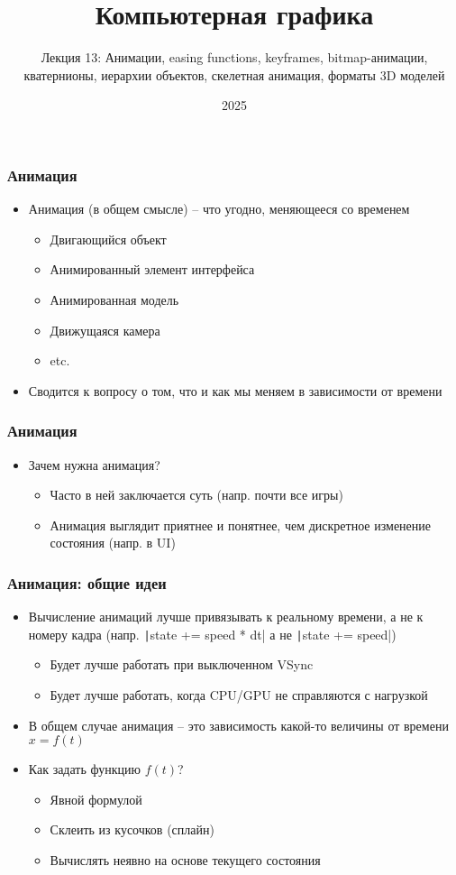 \documentclass[10pt]{beamer}
\title{Компьютерная графика}
\subtitle{Лекция 13: Анимации, easing functions, keyframes, bitmap-анимации, кватернионы, иерархии объектов, скелетная анимация, форматы 3D моделей}
\date{2025}
\begin{document}
\frame{\titlepage}

\begin{frame}[fragile]
\frametitle{Анимация}
\begin{itemize}
\item Анимация (в общем смысле) -- что угодно, меняющееся со временем
\pause
\begin{itemize}
\item Двигающийся объект
\pause
\item Анимированный элемент интерфейса
\pause
\item Анимированная модель
\pause
\item Движущаяся камера
\pause
\item etc.
\end{itemize}
\pause
\item Сводится к вопросу о том, что и как мы меняем в зависимости от времени
\end{itemize}
\end{frame}

\begin{frame}[fragile]
\frametitle{Анимация}
\begin{itemize}
\item Зачем нужна анимация?
\pause
\begin{itemize}
\item Часто в ней заключается суть (напр. почти все игры)
\pause
\item Анимация выглядит приятнее и понятнее, чем дискретное изменение состояния (напр. в UI)
\end{itemize}  
\end{itemize}
\end{frame}

\begin{frame}[fragile]
\frametitle{Анимация: общие идеи}
\begin{itemize}
\item Вычисление анимаций лучше привязывать к реальному времени, а не к номеру кадра (напр. \texttt|state += speed * dt| а не \texttt|state += speed|)
\pause
\begin{itemize}
\item Будет лучше работать при выключенном VSync
\pause
\item Будет лучше работать, когда CPU/GPU не справляются с нагрузкой
\end{itemize}
\pause
\item В общем случае анимация -- это зависимость какой-то величины от времени \begin{math}x = f(t)\end{math}
\pause
\item Как задать функцию \begin{math}f(t)\end{math}?
\pause
\begin{itemize}
\item Явной формулой
\pause
\item Склеить из кусочков (сплайн)
\pause
\item Вычислять неявно на основе текущего состояния
\end{itemize}
\end{itemize}
\end{frame}
\end{document}
